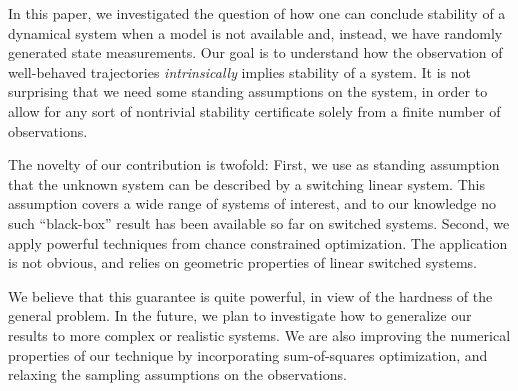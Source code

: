 In this paper, we investigated the question of how one can conclude stability of a dynamical system when a model is not available and, instead, we have randomly generated state measurements. Our goal is to understand how the observation of well-behaved trajectories \emph{intrinsically} implies stability of a system. It is not surprising that we need some standing assumptions on the system, in order to allow for any sort of nontrivial stability certificate solely from a finite number of observations.

The novelty of our contribution is twofold: First, we use as standing assumption that the unknown system can be described by a switching linear system. This assumption covers a wide range of systems of interest, and to our knowledge no such ``black-box'' result has been available so far on switched systems.  
Second, we apply powerful techniques from chance constrained optimization. The application is not obvious, and relies on geometric properties of linear switched systems.

We believe that this guarantee is quite powerful, in view of the hardness of the general problem. In the future, we plan to investigate how to generalize our results to more complex or realistic systems. We are also improving the numerical properties of our technique by incorporating sum-of-squares optimization, and relaxing the sampling assumptions on the observations.

